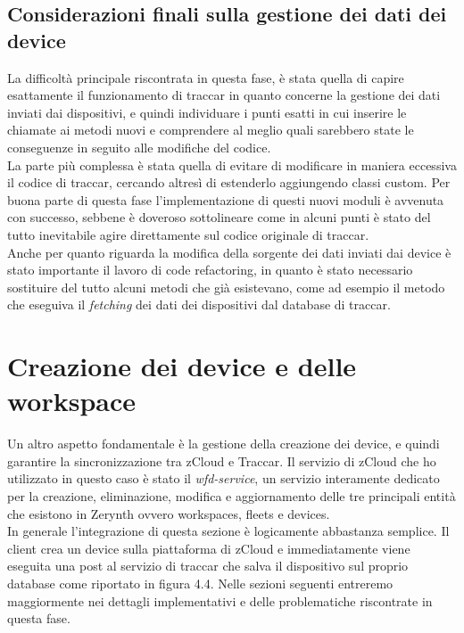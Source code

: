 \documentclass[a4paper,titlepage,12pt]{book}
\begin{document}
{\subsection{
Considerazioni finali sulla gestione dei dati dei device}
La difficoltà principale riscontrata in questa fase, è stata quella di capire esattamente il funzionamento di traccar in quanto concerne la gestione dei dati inviati dai dispositivi, e quindi individuare i punti esatti in cui inserire le chiamate ai metodi nuovi e comprendere al meglio quali sarebbero state le conseguenze in seguito alle modifiche del codice.\\
 La parte più complessa è stata quella di evitare di modificare in maniera eccessiva il codice di traccar, cercando altresì di estenderlo aggiungendo classi custom. Per buona parte di questa fase l'implementazione di questi nuovi moduli è avvenuta con successo, sebbene è doveroso sottolineare come in alcuni punti è stato del tutto inevitabile agire direttamente sul codice originale di traccar.\\
Anche per quanto riguarda la modifica della sorgente dei dati inviati dai device è stato importante il lavoro di code refactoring, in quanto è stato necessario sostituire del tutto alcuni metodi che già esistevano, come ad esempio il metodo che eseguiva il \textit{fetching} dei dati dei dispositivi dal database di traccar.

\section{
Creazione dei device e delle workspace}
Un altro aspetto fondamentale è la gestione della creazione dei device, e quindi garantire la sincronizzazione tra zCloud e Traccar. Il servizio di zCloud che ho utilizzato in questo caso è stato il \textit{wfd-service}, un servizio interamente dedicato per la creazione, eliminazione, modifica e aggiornamento delle tre principali entità che esistono in Zerynth ovvero workspaces, fleets e devices. \\
In generale l'integrazione di questa sezione è logicamente abbastanza semplice. Il client crea un device sulla piattaforma di zCloud e immediatamente viene eseguita una post al servizio di traccar che salva il dispositivo sul proprio database come riportato in figura 4.4. Nelle sezioni seguenti entreremo maggiormente nei dettagli implementativi e delle problematiche riscontrate in questa fase.


}
\end{document}
